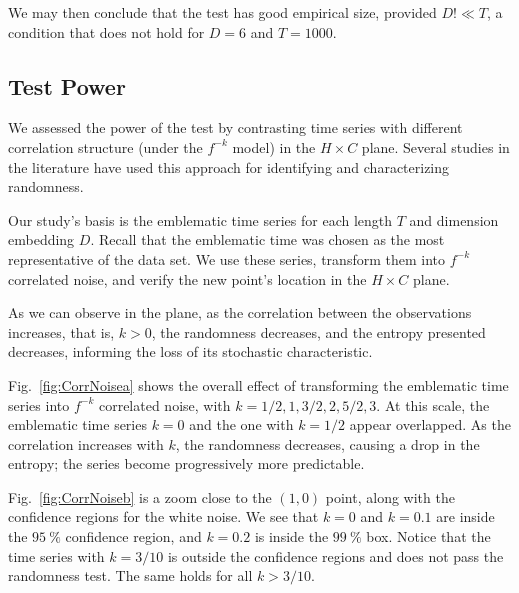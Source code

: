 We may then conclude that the test has good empirical size, provided $D!\ll T$, a condition that does not hold for $D=6$ and $T=1000$.


\subsection{Test Power}

We assessed the power of the test by contrasting time series with different correlation structure (under the $f^{-k}$ model) in the $H \times C$ plane.
Several studies in the literature have used this approach for identifying and characterizing randomness.

Our study's basis is the emblematic time series for each length $T$ and dimension embedding $D$.
Recall that the emblematic time was chosen as the most representative of the data set.
We use these series, transform them into $f^{-k}$ correlated noise, and verify the new point's location in the $H\times C$ plane.

As we can observe in the plane, as the correlation between the observations increases, that is, $k > 0$, the randomness decreases, and the entropy presented decreases, informing the loss of its stochastic characteristic.

Fig.~\ref{fig:CorrNoisea} shows the overall effect of transforming the emblematic time series into $f^{-k}$ correlated noise, with $k=1/2,1,3/2,2,5/2,3$.
At this scale, the emblematic time series $k=0$ and the one with $k=1/2$ appear overlapped.
As the correlation increases with $k$, the randomness decreases, causing a drop in the entropy; the series become progressively more predictable.

Fig.~\ref{fig:CorrNoiseb} is a zoom close to the $(1,0)$ point, along with the confidence regions for the white noise.
We see that $ k = 0 $ and $ k = 0.1 $ are inside the $\SI{95}{\percent}$ confidence region, and $ k = 0.2 $ is inside the $\SI{99}{\percent}$ box.
Notice that the time series with $k=3/10$ is outside the confidence regions and does not pass the randomness test.
The same holds for all $k>3/10$.

